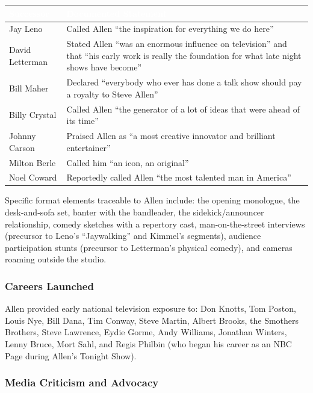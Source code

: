 \documentclass[11pt,letterpaper]{article}
\newcommand{\tableheader}[1]{\textbf{\sffamily\textcolor{white}{#1}}}
\begin{document}
\begin{center}
\begin{tabularx}{\textwidth}{L{3.5cm}X}
\toprule
{}
\tableheader{Successor} & \tableheader{Documented Statement} \\
\midrule
Jay Leno & Called Allen ``the inspiration for everything we do here'' \\
David Letterman & Stated Allen ``was an enormous influence on television'' and that ``his early work is really the foundation for what late night shows have become'' \\
Bill Maher & Declared ``everybody who ever has done a talk show should pay a royalty to Steve Allen'' \\
Billy Crystal & Called Allen ``the generator of a lot of ideas that were ahead of its time'' \\
Johnny Carson & Praised Allen as ``a most creative innovator and brilliant entertainer'' \\
Milton Berle & Called him ``an icon, an original'' \\
Noel Coward & Reportedly called Allen ``the most talented man in America'' \\
\bottomrule
\end{tabularx}
\end{center}

Specific format elements traceable to Allen include: the opening monologue, the desk-and-sofa set, banter with the bandleader, the sidekick/announcer relationship, comedy sketches with a repertory cast, man-on-the-street interviews (precursor to Leno's ``Jaywalking'' and Kimmel's segments), audience participation stunts (precursor to Letterman's physical comedy), and cameras roaming outside the studio.

\subsubsection{Careers Launched}

Allen provided early national television exposure to: Don Knotts, Tom Poston, Louis Nye, Bill Dana, Tim Conway, Steve Martin, Albert Brooks, the Smothers Brothers, Steve Lawrence, Eydie Gorme, Andy Williams, Jonathan Winters, Lenny Bruce, Mort Sahl, and Regis Philbin (who began his career as an NBC Page during Allen's Tonight Show).

\subsubsection{Media Criticism and Advocacy}
\end{document}
